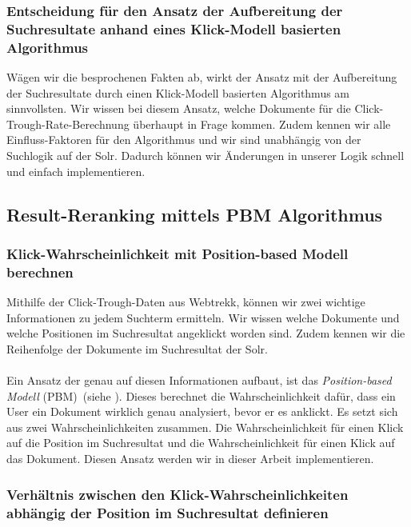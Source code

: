 \subsubsection{Entscheidung für den Ansatz der Aufbereitung der Suchresultate anhand eines Klick-Modell basierten Algorithmus}
\label{sec:Reranking:Methodik:SucheEinbinden:Entscheidung}

Wägen wir die besprochenen Fakten ab, wirkt der Ansatz mit der Aufbereitung der Suchresultate durch einen Klick-Modell basierten Algorithmus am sinnvollsten. Wir wissen bei diesem Ansatz, welche Dokumente für die Click-Trough-Rate-Berechnung überhaupt in Frage kommen. Zudem kennen wir alle Einfluss-Faktoren für den Algorithmus und wir sind unabhängig von der Suchlogik auf der Solr. Dadurch können wir Änderungen in unserer Logik schnell und einfach implementieren.

\subsection{Result-Reranking mittels PBM Algorithmus}
\label{sec:Reranking:Methodik:Result-RerankingPBM}

\subsubsection{Klick-Wahrscheinlichkeit mit Position-based Modell berechnen}
\label{sec:Reranking:Methodik:Result-RerankingPBM:Klick-Wahrscheinlichkeit}

Mithilfe der Click-Trough-Daten aus Webtrekk, können wir zwei wichtige Informationen zu jedem Suchterm ermitteln. Wir wissen welche Dokumente und welche Positionen im Suchresultat angeklickt worden sind. Zudem kennen wir die Reihenfolge der Dokumente im Suchresultat der Solr.
\\
\\
Ein Ansatz der genau auf diesen Informationen aufbaut, ist das \textit{Position-based Modell} (PBM)~(siehe \cite{pbm}). Dieses berechnet die Wahrscheinlichkeit dafür, dass ein User ein Dokument wirklich genau analysiert, bevor er es anklickt. Es setzt sich aus zwei Wahrscheinlichkeiten zusammen. Die Wahrscheinlichkeit für einen Klick auf die Position im Suchresultat und die Wahrscheinlichkeit für einen Klick auf das Dokument. Diesen Ansatz werden wir in dieser Arbeit implementieren.

\subsubsection{Verhältnis zwischen den Klick-Wahrscheinlichkeiten abhängig der Position im Suchresultat definieren}
\label{sec:Reranking:Methodik:Result-RerankingPBM:VerhaeltnisKlick-Wahrscheinlichkeiten}

